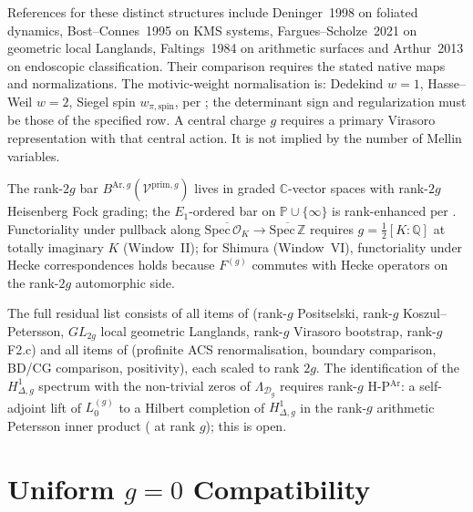 \begin{remark}
\label{v4-arith:w9-r6:rem:independence-deninger}
References for these distinct structures include Deninger~1998
on foliated dynamics, Bost--Connes~1995 on KMS systems,
Fargues--Scholze~2021 on geometric local Langlands,
Faltings~1984 on arithmetic surfaces and Arthur~2013 on
endoscopic classification. Their comparison requires the stated
native maps and normalizations. The motivic-weight normalisation is: Dedekind \(w=1\),
Hasse--Weil \(w=2\), Siegel spin \(w_{\pi,\mathrm{spin}}\), per
;
the determinant sign and regularization must be those of the
specified row. A central charge \(g\) requires a primary Virasoro
representation with that central action. It is not implied by the
number of Mellin variables.

The rank-\(2g\) bar \(B^{\mathrm{Ar},g}(\mathcal{V}^{\mathrm{prim},g})\) lives
in graded \(\mathbb{C}\)-vector spaces with rank-\(2g\) Heisenberg Fock grading;
the \(E_{1}\)-ordered bar on \(\mathbb{P}\cup\{\infty\}\) is rank-enhanced per
. Functoriality under pullback along
\(\overline{\mathrm{Spec}\,\mathcal{O}_{K}}\to\overline{\mathrm{Spec}\,\mathbb{Z}}\)
requires \(g=\tfrac{1}{2}[K:\mathbb{Q}]\) at totally imaginary \(K\)
(Window~II); for Shimura (Window~VI), functoriality under Hecke correspondences
holds because \(F^{(g)}\) commutes with Hecke operators on the rank-\(2g\)
automorphic side.

The full residual list consists of all items of 
(rank-\(g\) Positselski, rank-\(g\) Koszul--Petersson, \(GL_{2g}\) local
geometric Langlands, rank-\(g\) Virasoro bootstrap, rank-\(g\) F2.c) and
all items of  (profinite ACS renormalisation,
boundary comparison, BD/CG comparison, positivity), each scaled to rank \(2g\).
The identification of the \(H^{1}_{\Delta,g}\) spectrum with the non-trivial
zeros of \(\Lambda_{\mathcal{D}_{g}}\) requires rank-\(g\) H-P\(^{\mathrm{Ar}}\):
a self-adjoint lift of \(L^{(g)}_{0}\) to a Hilbert completion of
\(H^{1}_{\Delta,g}\) in the rank-\(g\) arithmetic Petersson inner product
( at rank \(g\)); this is open.
\end{remark}

\section{Uniform \(g=0\) Compatibility}
\label{v4-arith:w9-r6:g-zero-recovery}

